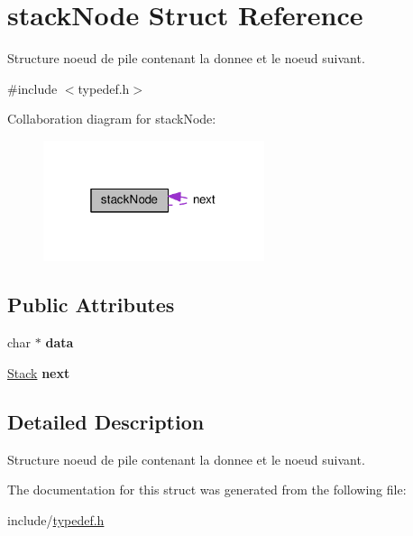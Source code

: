 \hypertarget{structstackNode}{}\section{stack\+Node Struct Reference}
\label{structstackNode}


Structure noeud de pile contenant la donnee et le noeud suivant.  




{\ttfamily \#include $<$typedef.\+h$>$}



Collaboration diagram for stack\+Node\+:\nopagebreak
\begin{figure}[H]
\begin{center}
\leavevmode
\includegraphics[width=184pt]{structstackNode__coll__graph}
\end{center}
\end{figure}
\subsection*{Public Attributes}
\begin{DoxyCompactItemize}
\item 
char $\ast$ {\bfseries data}\hypertarget{structstackNode_ab8a7f2b607f656ddbdaed84d1c5acbae}{}\label{structstackNode_ab8a7f2b607f656ddbdaed84d1c5acbae}

\item 
\hyperlink{structstackNode}{Stack} {\bfseries next}\hypertarget{structstackNode_a7225663fc2f1d3bad4623de65857c461}{}\label{structstackNode_a7225663fc2f1d3bad4623de65857c461}

\end{DoxyCompactItemize}


\subsection{Detailed Description}
Structure noeud de pile contenant la donnee et le noeud suivant. 

The documentation for this struct was generated from the following file\+:\begin{DoxyCompactItemize}
\item 
include/\hyperlink{typedef_8h}{typedef.\+h}\end{DoxyCompactItemize}

